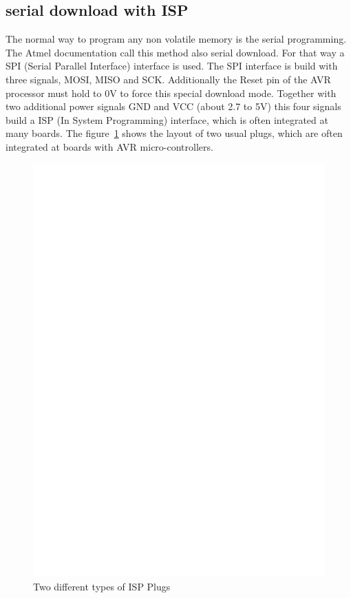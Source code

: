 \subsection{serial download with ISP}

The normal way to program any non volatile memory is the serial programming.
The Atmel documentation call this method also serial download.
For that way a SPI (Serial Parallel Interface) interface is used.
The SPI interface is build with three signals, MOSI, MISO and SCK.
Additionally the Reset pin of the AVR processor must hold to 0V to force
this special download mode.
Together with two additional power signals GND and VCC (about 2.7 to 5V) this
four signals build a ISP (In System Programming) interface, which is often
integrated at many boards.
The figure~\ref{fig:ISP} shows the layout of two usual plugs, which are
often integrated at boards with AVR micro-controllers.

\begin{figure}[H]
\centering
\includegraphics[width=12cm]{../FIG/ISP.eps}
\caption{Two different types of ISP Plugs}
\label{fig:ISP}
\end{figure}

